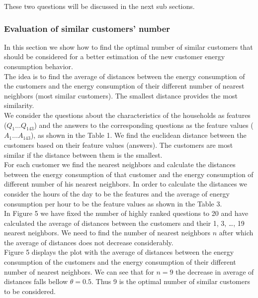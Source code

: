 \documentclass{sig-alternate-10pt}
\begin{document}
These two questions will be discussed in the next sub sections.\\


\subsubsection{Evaluation of similar customers' number}

In this section we show how to find the optimal number of similar customers that should be considered for a better estimation of the new customer energy consumption behavior.\\

The idea is to find the average of distances between the energy consumption of the customers and the energy consumption of their different number of nearest neighbors (most similar customers). The smallest distance provides the most similarity.\\ 
 
We consider the questions about the characteristics of the households as features ($Q_1 \ldots Q_{143}$) and the answers to the corresponding questions as the feature values ($A_1 \ldots A_{143}$), as shown in the Table 1. We find the euclidean distance between the customers based on their feature values (answers). The customers are most similar if the distance between them is the smallest.\\ 

For each customer we find the nearest neighbors and calculate the distances between the energy consumption of that customer and the energy consumption of different number of his nearest neighbors. In order to calculate the distances we consider the hours of the day to be the features and the average of energy consumption per hour to be the feature values as shown in the Table 3.\\

In Figure 5 we have fixed the number of highly ranked questions to 20 and have calculated the average of distances between the customers and their 1, 3, \ldots , 19 nearest neighbors. We need to find the number of nearest neighbors $n$ after which the average of distances does not decrease considerably.\\

Figure 5 displays the plot with the average of distances between the energy consumption of the customers and the energy consumption of their different number of nearest neighbors. We can see that for $n=9$ the decrease in average of distances falls bellow $\theta=0.5$. Thus 9 is the optimal number of similar customers to be considered.\\ 
\end{document}
